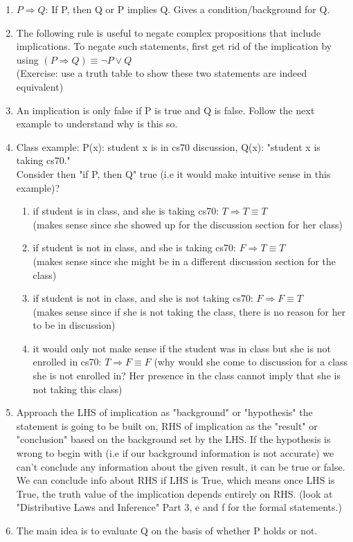 \documentclass[11pt]{article}
\begin{document}
\begin{enumerate}
\item $P \Rightarrow Q$: If P, then Q or P implies Q. Gives a condition/background for Q.
\item 
The following rule is useful to negate complex propositions that include implications. To negate such statements, first get rid of the implication by using $(P \Rightarrow Q) \equiv {\neg P} \vee Q$\\
(Exercise: use a truth table to show these two statements are indeed equivalent)
\item An implication is only false if P is true and Q is false. Follow the next example to understand why is this so.
\item Class example: P(x): student x is in cs70 discussion, Q(x): "student x is taking cs70." \\ Consider then "if P, then Q" true (i.e it would make intuitive sense in this example)?
\begin{enumerate}
\item if student is in class, and she is taking cs70: $T \Rightarrow T
 \equiv T$  \\(makes sense since she showed up for the discussion section for her class)
 \item if student is not in class, and she is taking cs70: $F \Rightarrow T  \equiv T$ \\ (makes sense since she might be in a different discussion section for the class)
 \item if student is not in class, and she is not taking cs70: $F \Rightarrow F
 \equiv T$ \\ (makes sense since if she is not taking the class, there is no reason for her to be in discussion)
 \item it would only not make sense if the student was in class but she is not enrolled in cs70: $T \Rightarrow F \equiv F$ (why would she come to discussion for a class she is not enrolled in? Her presence in the class cannot imply that she is not taking this class)
\end{enumerate}
\item Approach the LHS of implication as "background" or "hypothesis" the statement is going to be built on, RHS of implication as the "result" or "conclusion" based on the background set by the LHS. If the hypothesis is wrong to begin with (i.e if our background information is not accurate) we can't conclude any information about the given result, it can be true or false. We can conclude info about RHS if LHS is True, which means once LHS is True, the truth value of the implication depends entirely on RHS. (look at "Distributive Laws and Inference" Part 3, e and f for the formal statements.)
\item The main idea is to evaluate Q on the basis of whether P holds or not.

\end{enumerate}
\end{document}

